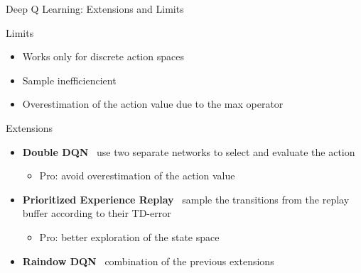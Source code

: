 \documentclass[presentation, 9pt]{beamer}\mode<presentation>{\usetheme{AMSBolognaFC}}
\begin{document}
\begin{frame}{Deep Q Learning: Extensions and Limits}
	\begin{block}{Limits}
		\begin{itemize}
			\item Works only for discrete action spaces
			\item Sample inefficiencient
			\item Overestimation of the action value due to the max operator
		\end{itemize}
	\end{block}
	\begin{block}{Extensions}
		\begin{itemize}
			\item \textbf{Double DQN} \faArrowRight \, use two separate networks to select and evaluate the action
			\begin{itemize}
				\item Pro: avoid overestimation of the action value
			\end{itemize}
			\item \textbf{Prioritized Experience Replay} \faArrowRight \, sample the transitions from the replay buffer according to their TD-error
			\begin{itemize}
				\item Pro: better exploration of the state space
			\end{itemize}
			\item \textbf{Raindow DQN} \faArrowRight \, combination of the previous extensions
		\end{itemize}
	\end{block}

\end{frame}
\end{document}
